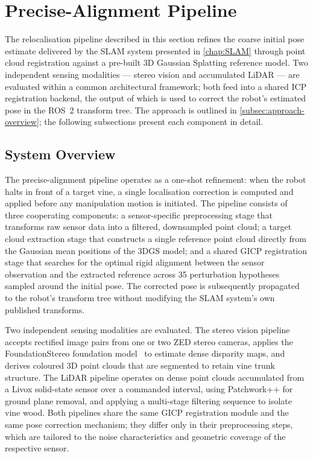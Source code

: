 \section{Precise-Alignment Pipeline}
\label{sec:precise-alignment-methodology}

The relocalisation pipeline described in this section refines the coarse initial pose estimate delivered by the SLAM system presented in \cref{chap:SLAM} through point cloud registration against a pre-built 3D Gaussian Splatting reference model. Two independent sensing modalities --- stereo vision and accumulated LiDAR --- are evaluated within a common architectural framework; both feed into a shared ICP registration backend, the output of which is used to correct the robot's estimated pose in the ROS~2 transform tree. The approach is outlined in \cref{subsec:approach-overview}; the following subsections present each component in detail.

\subsection{System Overview}
\label{subsec:pa-system-overview}

The precise-alignment pipeline operates as a one-shot refinement: when the robot halts in front of a target vine, a single localisation correction is computed and applied before any manipulation motion is initiated. The pipeline consists of three cooperating components: a sensor-specific preprocessing stage that transforms raw sensor data into a filtered, downsampled point cloud; a target cloud extraction stage that constructs a single reference point cloud directly from the Gaussian mean positions of the 3DGS model; and a shared GICP registration stage that searches for the optimal rigid alignment between the sensor observation and the extracted reference across 35 perturbation hypotheses sampled around the initial pose. The corrected pose is subsequently propagated to the robot's transform tree without modifying the SLAM system's own published transforms.

Two independent sensing modalities are evaluated. The stereo vision pipeline accepts rectified image pairs from one or two ZED stereo cameras, applies the FoundationStereo foundation model~\cite{wenFoundationStereoZeroShot2025}
to estimate dense disparity maps, and derives coloured 3D point clouds that are segmented to retain vine trunk structure. The LiDAR pipeline operates on dense point clouds accumulated from a Livox solid-state sensor over a commanded interval, using Patchwork++ for ground plane removal, and applying a multi-stage filtering sequence to isolate vine wood. Both pipelines share the same GICP registration module and the same pose correction mechanism; they differ only in their preprocessing steps, which are tailored to the noise characteristics and geometric coverage of the respective sensor.

